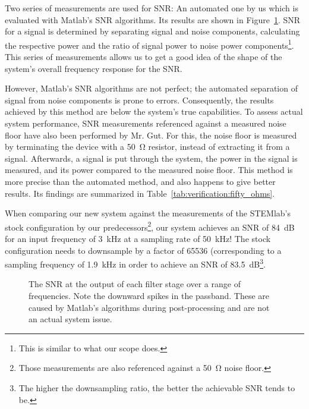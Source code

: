 Two  series  of  measurements  are  used  for  SNR: An  automated  one  by  us
which  is  evaluated  with  Matlab's SNR  algorithms. Its  results  are  shown
in  Figure~\ref{fig:verification:snrAll}. SNR for  a signal  is determined  by
separating signal and  noise components, calculating the  respective power and
the ratio of signal power to noise power components\footnote{%
    This is similar to what our scope does.%
}.
This series of measurements  allows us to get a good idea of  the shape of the
system's overall frequency response for the SNR.

However, Matlab's SNR algorithms are  not perfect; the automated separation of
signal from  noise components  is prone  to errors. Consequently,  the results
achieved by  this method are  below the system's true  capabilities. To assess
actual  system performance,  SNR  measurements referenced  against a  measured
noise floor have also been performed  by Mr. Gut. For this, the noise floor is
measured by terminating  the device with a \SI{50}{\ohm}  resistor, instead of
extracting it from  a signal. Afterwards, a signal is put  through the system,
the  power  in  the  signal  is  measured,  and  its  power  compared  to  the
measured noise floor. This  method is more precise than  the automated method,
and  also  happens to  give  better  results. Its findings are  summarized  in
Table~\ref{tab:verification:fifty_ohms}.

When comparing our new system against  the measurements of the STEMlab's stock
configuration by our predecessors\footnote{%
    Those  measurements  are also  referenced  against  a \SI{50}{\ohm}  noise
    floor.%
}, our system achieves an SNR of \SI{84}{\dB} for an input frequency of \SI{3}{\kHz}
at a sampling rate of \SI{50}{\kHz}! The stock configuration needs to downsample
by a factor of \num{65536} (corresponding to a sampling frequency of \SI{1.9}{\kHz}
in order to achieve an SNR of \SI{83.5}{\dB}\footnote{%
    The higher the downsampling ratio, the  better the achievable SNR tends to
    be.%
}.

\begin{figure}
    \centering
    
    \caption[SNR at Filter Outputs]{%
        The  SNR  at  the  output  of  each  filter  stage  over  a  range  of
        frequencies.   Note the  downward  spikes in  the passband. These  are
        caused by  Matlab's algorithms during  post-processing and are  not an
        actual system issue.%
    }
    \label{fig:verification:snrAll}
\end{figure}


